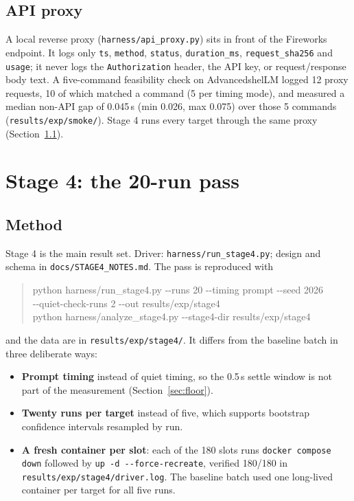 \documentclass[a4paper,11pt]{article}
\begin{document}
\subsection{API proxy}

A local reverse proxy (\texttt{harness/api\_proxy.py}) sits in front of the
Fireworks endpoint. It logs only \texttt{ts}, \texttt{method},
\texttt{status}, \texttt{duration\_ms}, \texttt{request\_sha256} and
\texttt{usage}; it never logs the \texttt{Authorization} header, the API key,
or request/response body text. A five-command feasibility check on
AdvancedshelLM logged 12 proxy requests, 10 of which matched a command (5 per
timing mode), and measured a median non-API gap of 0.045\,s (min 0.026, max
0.075) over those 5 commands (\texttt{results/exp/smoke/}). Stage 4 runs every target through
the same proxy (Section~\ref{sec:s4-method}).

\section{Stage 4: the 20-run pass}
\label{sec:s4}

\subsection{Method}
\label{sec:s4-method}

Stage 4 is the main result set. Driver: \texttt{harness/run\_stage4.py};
design and schema in \texttt{docs/STAGE4\_NOTES.md}. The pass is reproduced
with
\begin{quote}\footnotesize\ttfamily
python harness/run\_stage4.py -{}-runs 20 -{}-timing prompt -{}-seed 2026 \\
\hspace*{2em}-{}-quiet-check-runs 2 -{}-out results/exp/stage4 \\
python harness/analyze\_stage4.py -{}-stage4-dir results/exp/stage4
\end{quote}
and the data are in \texttt{results/exp/stage4/}. It differs from the baseline
batch in three deliberate ways:

\begin{itemize}[leftmargin=*]
\item \textbf{Prompt timing} instead of quiet timing, so the 0.5\,s settle
  window is not part of the measurement (Section~\ref{sec:floor}).
\item \textbf{Twenty runs per target} instead of five, which supports
  bootstrap confidence intervals resampled by run.
\item \textbf{A fresh container per slot}: each of the 180 slots runs
  \texttt{docker compose down} followed by \texttt{up -d -{}-force-recreate},
  verified 180/180 in \texttt{results/exp/stage4/driver.log}. The baseline
  batch used one long-lived container per target for all five runs.
\end{itemize}
\end{document}
